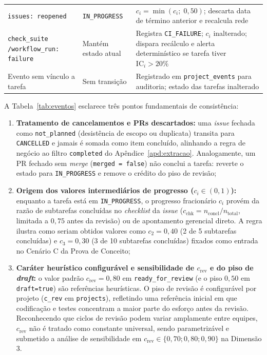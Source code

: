 \documentclass[12pt,openany,oneside,a4paper,english,brazilian,sumario=tradicional]{abntex2}
\newcommand{\fonteautores}{\par\vspace{1mm}{\small Fonte: Elaborado pelos autores (2026).}}
\newcommand{\IC}{\mathrm{IC}}
\begin{document}
\begin{table}[htbp]
\begin{tabularx}{\textwidth}{L{4.3cm} L{2.9cm} Y}
\texttt{issues: reopened} & \texttt{IN\_\allowbreak PROGRESS} & $c_i = \min(c_i;\; 0{,}50)$; descarta data de término anterior e recalcula rede\\
\texttt{check\_\allowbreak suite /\allowbreak  workflow\_\allowbreak run: failure} & Mantém estado atual & Registra \texttt{CI\_\allowbreak FAILURE}; $c_i$ inalterado; dispara recálculo e alerta determinístico se tarefa tiver $\IC_i > 20\%$\\
Evento sem vínculo a tarefa & Sem transição & Registrado em \texttt{project\_\allowbreak events} para auditoria; estado das tarefas inalterado\\
\bottomrule
\end{tabularx}
\fonteautores
\end{table}

A Tabela~\ref{tab:eventos} esclarece três pontos fundamentais de consistência:
\begin{enumerate}
  \item \textbf{Tratamento de cancelamentos e PRs descartados:} uma \textit{issue} fechada como \texttt{not\_\allowbreak planned} (desistência de escopo ou duplicata) transita para \texttt{CANCELLED} e jamais é somada como item concluído, alinhando a regra de negócio ao filtro \texttt{completed} do Apêndice~\ref{apd:extracao}. Analogamente, um PR fechado sem \textit{merge} (\texttt{merged = false}) não conclui a tarefa: reverte o estado para \texttt{IN\_\allowbreak PROGRESS} e remove o crédito do piso de revisão;
  \item \textbf{Origem dos valores intermediários de progresso ($c_i \in (0, 1)$):} enquanto a tarefa está em \texttt{IN\_\allowbreak PROGRESS}, o progresso fracionário $c_i$ provém da razão de subtarefas concluídas no \textit{checklist} da \textit{issue} ($c_{\mathrm{chk}} = n_{\mathrm{concl}}/n_{\mathrm{total}}$, limitada a $0{,}75$ antes da revisão) ou de apontamento gerencial direto. A regra ilustra como seriam obtidos valores como $c_2 = 0{,}40$ (2 de 5 subtarefas concluídas) e $c_3 = 0{,}30$ (3 de 10 subtarefas concluídas) fixados como entrada no Cenário C da Prova de Conceito;
  \item \textbf{Caráter heurístico configurável e sensibilidade de $c_{\mathrm{rev}}$ e do piso de \textit{draft}:} o valor padrão $c_{\mathrm{rev}} = 0{,}80$ em \texttt{ready\_\allowbreak for\_\allowbreak review} (e o piso $0{,}50$ em \texttt{draft=true}) são referências heurísticas. O piso de revisão é configurável por projeto (\texttt{c\_\allowbreak rev} em \texttt{projects}), refletindo uma referência inicial em que codificação e testes concentram a maior parte do esforço antes da revisão. Reconhecendo que ciclos de revisão podem variar amplamente entre equipes, $c_{\mathrm{rev}}$ não é tratado como constante universal, sendo parametrizável e submetido a análise de sensibilidade em $c_{\mathrm{rev}} \in \{0{,}70; 0{,}80; 0{,}90\}$ na Dimensão 3.
\end{enumerate}
\end{document}
